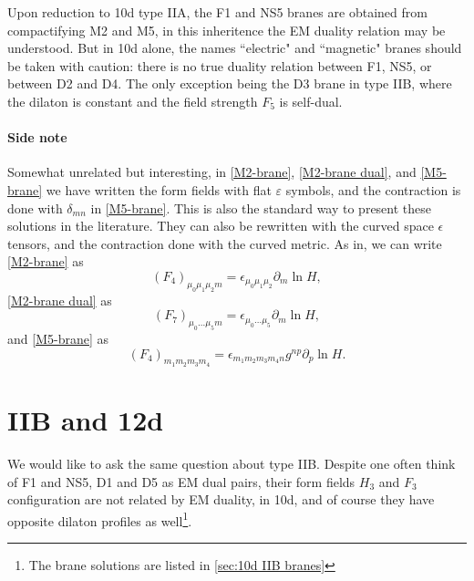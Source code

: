 Upon reduction to 10d type IIA, the F1 and NS5 branes are obtained from compactifying M2 and M5, in this inheritence the EM duality relation may be understood.
But in 10d alone, the names ``electric" and ``magnetic" branes should be taken with caution: there is no true duality relation between F1, NS5, or between D2 and D4. The only exception being the D3 brane in type IIB, where the dilaton is constant and the field strength $F_5$ is self-dual.

\paragraph{Side note}
Somewhat unrelated but interesting, in \eqref{M2-brane}, \eqref{M2-brane dual}, and \eqref{M5-brane} we have written the form fields with flat $\varepsilon$ symbols, and the contraction is done with $\delta_{mn}$ in \eqref{M5-brane}.
This is also the standard way to present these solutions in the literature.
They can also be rewritten with the curved space $\epsilon$ tensors, and the contraction done with the curved metric.
As in, we can write \eqref{M2-brane} as
\begin{equation}
(F_4)_{\mu_0 \mu_1 \mu_2 m} = \epsilon_{\mu_0 \mu_1 \mu_2}\partial_m \ln H,
\end{equation}
\eqref{M2-brane dual} as
\begin{equation}
(F_7)_{\mu_0 ... \mu_5 m} = \epsilon_{\mu_0 ... \mu_5}\partial_m \ln H,
\end{equation}
and \eqref{M5-brane} as
\begin{equation}
(F_4)_{m_1 m_2 m_3 m_4} = \epsilon_{m_1 m_2 m_3 m_4 n}g^{np} \partial_p \ln H.
\end{equation}


\section{IIB and 12d}

We would like to ask the same question about type IIB.
Despite one often think of F1 and NS5, D1 and D5 as EM dual pairs, their form fields $H_3$ and $F_3$ configuration are not related by EM duality, in 10d, and of course they have opposite dilaton profiles as well\footnote{The brane solutions are listed in \ref{sec:10d IIB branes}}.

